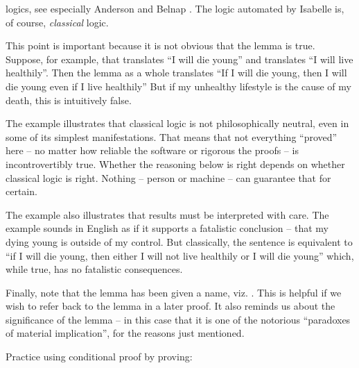 \begin{isabellebody}
\begin{isamarkuptext}
{logics, see especially Anderson and Belnap \cite{anderson_entailment_1976}.} The logic automated 
by Isabelle is, of course, \emph{classical} logic.%
\end{isamarkuptext}\isamarkuptrue%
%
\begin{isamarkuptext}%
This point is important because it is not obvious that the lemma is true. Suppose, for example,
that  translates ``I will die young'' and  translates ``I will live healthily''. 
Then the lemma as a whole translates ``If I will die young, then I will die young even if I live
healthily'' But if my unhealthy lifestyle is the cause of my death, this is intuitively false.%
\end{isamarkuptext}\isamarkuptrue%
%
\begin{isamarkuptext}%
The example illustrates that classical logic is not philosophically neutral, even in some of its 
simplest manifestations. That means that not everything ``proved'' here -- no matter how reliable
the software or rigorous the proofs -- is incontrovertibly true. Whether the reasoning below is right
depends on whether classical logic is right. Nothing -- person or machine -- can guarantee that for
certain.%
\end{isamarkuptext}\isamarkuptrue%
%
\begin{isamarkuptext}%
The example also illustrates that results must be interpreted with care. The example sounds
in English as if it supports a fatalistic conclusion -- that my dying young is outside of my control.
But classically, the sentence is equivalent to ``if I will die young, then either I will not live
healthily or I will die young'' which, while true, has no fatalistic consequences.%
\end{isamarkuptext}\isamarkuptrue%
%
\begin{isamarkuptext}%
Finally, note that the lemma has been given a name, viz. . This is
helpful if we wish to refer back to the lemma in a later proof. It also reminds us about the significance
of the lemma -- in this case that it is one of the notorious ``paradoxes of material implication'',
for the reasons just mentioned.%
\end{isamarkuptext}\isamarkuptrue%
%
\begin{isamarkuptext}%
\begin{Exercise}[title={The Strict Positive Paradox}]
Practice using conditional proof by proving: \end{Exercise}%
\end{isamarkuptext}\isamarkuptrue%

\end{isabellebody}
